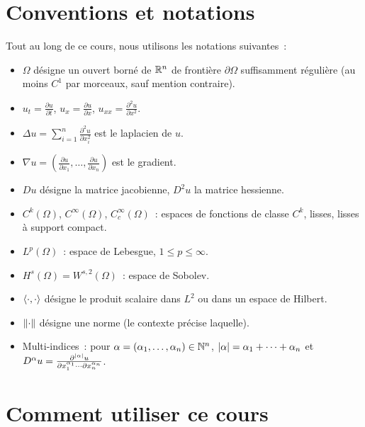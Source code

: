 \section*{Conventions et notations}

Tout au long de ce cours, nous utilisons les notations suivantes~:
\begin{itemize}
    \item $\Omega$ d\'esigne un ouvert born\'e de $\mathbb{R}^n$ de fronti\`ere $\partial\Omega$
          suffisamment r\'eguli\`ere (au moins $C^1$ par morceaux, sauf mention contraire).
    \item $u_t = \frac{\partial u}{\partial t}$, $u_x = \frac{\partial u}{\partial x}$,
          $u_{xx} = \frac{\partial^2 u}{\partial x^2}$.
    \item $\Delta u = \sum_{i=1}^{n} \frac{\partial^2 u}{\partial x_i^2}$ est le
          laplacien de $u$.
    \item $\nabla u = \left(\frac{\partial u}{\partial x_1}, \ldots,
          \frac{\partial u}{\partial x_n}\right)$ est le gradient.
    \item $Du$ d\'esigne la matrice jacobienne, $D^2 u$ la matrice hessienne.
    \item $C^k(\Omega)$, $C^\infty(\Omega)$, $C_c^\infty(\Omega)$~: espaces de
          fonctions de classe $C^k$, lisses, lisses \`a support compact.
    \item $L^p(\Omega)$~: espace de Lebesgue, $1 \leq p \leq \infty$.
    \item $H^s(\Omega) = W^{s,2}(\Omega)$~: espace de Sobolev.
    \item $\langle \cdot, \cdot \rangle$ d\'esigne le produit scalaire dans $L^2$ ou dans un
          espace de Hilbert.
    \item $\left\| \cdot \right\|$ d\'esigne une norme (le contexte pr\'ecise laquelle).
    \item Multi-indices~: pour $\alpha = (\alpha_1, \ldots, \alpha_n) \in \mathbb{N}^n$,
          $\left| \alpha \right| = \alpha_1 + \cdots + \alpha_n$ et
          $D^\alpha u = \frac{\partial^{\left| \alpha \right|} u}{\partial x_1^{\alpha_1}
          \cdots \partial x_n^{\alpha_n}}$.
\end{itemize}

\section*{Comment utiliser ce cours}

